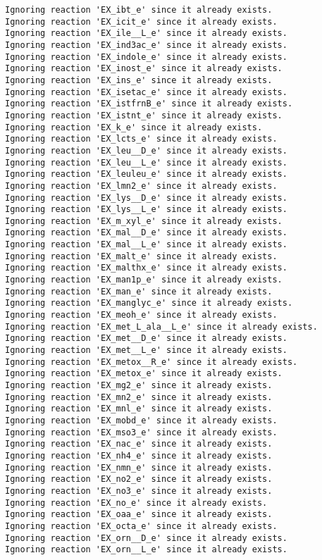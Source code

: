 \documentclass[
  letterpaper,
  DIV=11,
  numbers=noendperiod]{scrartcl}
\begin{document}
\begin{verbatim}
Ignoring reaction 'EX_ibt_e' since it already exists.
Ignoring reaction 'EX_icit_e' since it already exists.
Ignoring reaction 'EX_ile__L_e' since it already exists.
Ignoring reaction 'EX_ind3ac_e' since it already exists.
Ignoring reaction 'EX_indole_e' since it already exists.
Ignoring reaction 'EX_inost_e' since it already exists.
Ignoring reaction 'EX_ins_e' since it already exists.
Ignoring reaction 'EX_isetac_e' since it already exists.
Ignoring reaction 'EX_istfrnB_e' since it already exists.
Ignoring reaction 'EX_istnt_e' since it already exists.
Ignoring reaction 'EX_k_e' since it already exists.
Ignoring reaction 'EX_lcts_e' since it already exists.
Ignoring reaction 'EX_leu__D_e' since it already exists.
Ignoring reaction 'EX_leu__L_e' since it already exists.
Ignoring reaction 'EX_leuleu_e' since it already exists.
Ignoring reaction 'EX_lmn2_e' since it already exists.
Ignoring reaction 'EX_lys__D_e' since it already exists.
Ignoring reaction 'EX_lys__L_e' since it already exists.
Ignoring reaction 'EX_m_xyl_e' since it already exists.
Ignoring reaction 'EX_mal__D_e' since it already exists.
Ignoring reaction 'EX_mal__L_e' since it already exists.
Ignoring reaction 'EX_malt_e' since it already exists.
Ignoring reaction 'EX_malthx_e' since it already exists.
Ignoring reaction 'EX_man1p_e' since it already exists.
Ignoring reaction 'EX_man_e' since it already exists.
Ignoring reaction 'EX_manglyc_e' since it already exists.
Ignoring reaction 'EX_meoh_e' since it already exists.
Ignoring reaction 'EX_met_L_ala__L_e' since it already exists.
Ignoring reaction 'EX_met__D_e' since it already exists.
Ignoring reaction 'EX_met__L_e' since it already exists.
Ignoring reaction 'EX_metox__R_e' since it already exists.
Ignoring reaction 'EX_metox_e' since it already exists.
Ignoring reaction 'EX_mg2_e' since it already exists.
Ignoring reaction 'EX_mn2_e' since it already exists.
Ignoring reaction 'EX_mnl_e' since it already exists.
Ignoring reaction 'EX_mobd_e' since it already exists.
Ignoring reaction 'EX_mso3_e' since it already exists.
Ignoring reaction 'EX_nac_e' since it already exists.
Ignoring reaction 'EX_nh4_e' since it already exists.
Ignoring reaction 'EX_nmn_e' since it already exists.
Ignoring reaction 'EX_no2_e' since it already exists.
Ignoring reaction 'EX_no3_e' since it already exists.
Ignoring reaction 'EX_no_e' since it already exists.
Ignoring reaction 'EX_oaa_e' since it already exists.
Ignoring reaction 'EX_octa_e' since it already exists.
Ignoring reaction 'EX_orn__D_e' since it already exists.
Ignoring reaction 'EX_orn__L_e' since it already exists.

\end{verbatim}
\end{document}

